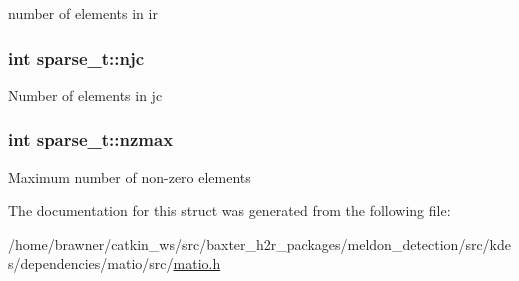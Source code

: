 number of elements in ir \hypertarget{structsparse__t_aa0ef6a0c8be3ad0e3a222371e68f7dd4}{
\subsubsection[{njc}]{\setlength{\rightskip}{0pt plus 5cm}int sparse\-\_\-t\-::njc}}\label{structsparse__t_aa0ef6a0c8be3ad0e3a222371e68f7dd4}
Number of elements in jc \hypertarget{structsparse__t_afd116055ad6a18c27b80333fdac45827}{
\subsubsection[{nzmax}]{\setlength{\rightskip}{0pt plus 5cm}int sparse\-\_\-t\-::nzmax}}\label{structsparse__t_afd116055ad6a18c27b80333fdac45827}
Maximum number of non-\/zero elements 

The documentation for this struct was generated from the following file\-:\begin{DoxyCompactItemize}
\item 
/home/brawner/catkin\-\_\-ws/src/baxter\-\_\-h2r\-\_\-packages/meldon\-\_\-detection/src/kdes/dependencies/matio/src/\hyperlink{matio_8h}{matio.\-h}\end{DoxyCompactItemize}
